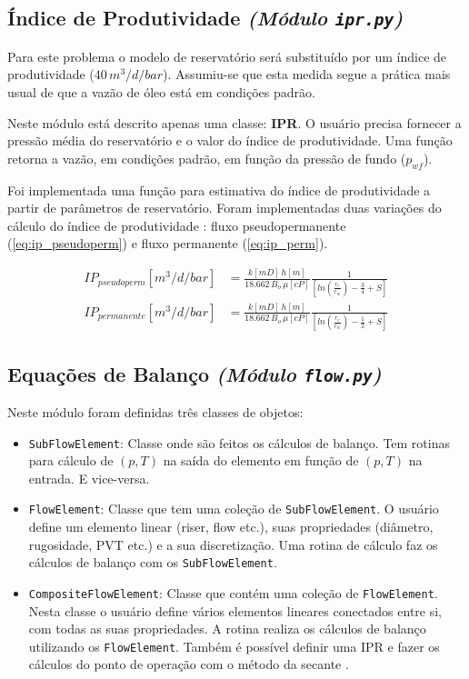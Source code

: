 \documentclass[final,3p]{elsarticle}
\numberwithin{equation}{section}
\begin{document}
    \subsection{Índice de Produtividade \emph{(Módulo \texttt{ipr.py})}}

        Para este problema o modelo de reservatório será substituído por um índice de produtividade ($40\,m^3/d/bar$). Assumiu-se que esta medida segue a prática mais usual de que a vazão de óleo está em condições padrão.

        Neste módulo está descrito apenas uma classe: \textbf{IPR}. O usuário precisa fornecer a pressão média do reservatório e o valor do índice de produtividade. Uma função retorna a vazão, em condições padrão, em função da pressão de fundo ($p_{wf}$).

        Foi implementada uma função para estimativa do índice de produtividade a partir de parâmetros de reservatório. Foram implementadas duas variações do cálculo do índice de produtividade \cite{rosa2006engenharia}: fluxo pseudopermanente (\ref{eq:ip_pseudoperm}) e fluxo permanente (\ref{eq:ip_perm}).

        \begin{align}
          IP_{pseudoperm} [m^3/d/bar] &= \frac{k[mD] \, h[m]}{18.662 \, B_o \, \mu[cP]} \frac{1}{\left[ ln(\frac{r_e}{r_w}) - \frac{3}{4} + S \right] } \label{eq:ip_pseudoperm} \\
          IP_{permanente} [m^3/d/bar] &= \frac{k[mD] \, h[m]}{18.662 \, B_o \, \mu[cP]} \frac{1}{\left[ ln(\frac{r_e}{r_w}) - \frac{1}{2} + S \right] } \label{eq:ip_perm}
        \end{align}

        \subsection{Equações de Balanço \emph{(Módulo \texttt{flow.py})}}

        Neste módulo foram definidas três classes de objetos:

        \begin{itemize}
          \item \texttt{SubFlowElement}: Classe onde são feitos os cálculos de balanço. Tem rotinas para cálculo de $(p,T)$ na saída do elemento em função de $(p,T)$ na entrada. E vice-versa.
          \item \texttt{FlowElement}: Classe que tem uma coleção de \texttt{SubFlowElement}. O usuário define um elemento linear (riser, flow etc.), suas propriedades (diâmetro, rugosidade, PVT etc.) e a sua discretização. Uma rotina de cálculo faz os cálculos de balanço com os \texttt{SubFlowElement}.
          \item \texttt{CompositeFlowElement}: Classe que contém uma coleção de \texttt{FlowElement}. Nesta classe o usuário define vários elementos lineares conectados entre si, com todas as suas propriedades. A rotina realiza os cálculos de balanço utilizando os \texttt{FlowElement}. Também é possível definir uma IPR e fazer os cálculos do ponto de operação com o método da secante \cite{burden2016analise}.
        \end{itemize}
\end{document}
